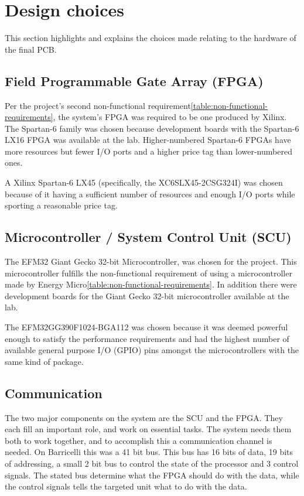 \section{Design choices} 
This section highlights and explains the choices made relating to the hardware of the final PCB.

\subsection{Field Programmable Gate Array (FPGA)} \label{pcb:design-choices:ss:fpga}
Per the project's second non-functional requirement\vref{table:non-functional-requirements}, the system's FPGA was required to be one produced by Xilinx.
The Spartan-6 family was chosen because development boards with the Spartan-6 LX16 FPGA was available at the lab.
Higher-numbered Spartan-6 FPGAs have more resources but fewer I/O ports and a higher price tag than lower-numbered ones.

A Xilinx Spartan-6 LX45 (specifically, the XC6SLX45-2CSG324I) was chosen because of it having a sufficient number of resources and enough I/O ports while sporting a reasonable price tag.


\subsection{Microcontroller / System Control Unit (SCU)} \label{pcb:design-choices:ss:scu}
The EFM32 Giant Gecko 32-bit Microcontroller, was chosen for the project.
This microcontroller fulfills the non-functional requirement of using a microcontroller made by Energy Micro\vref{table:non-functional-requirements}.
In addition there were development boards for the Giant Gecko 32-bit microcontroller available at the lab.

The EFM32GG390F1024-BGA112 was chosen because it was deemed powerful enough to satisfy the performance requirements and had the highest number of available general purpose I/O (GPIO) pins amongst the microcontrollers with the same kind of package.


\subsection{Communication} \label{pcb:design-choices:ss:internal_communication}
The two major components on the system are the SCU and the FPGA.
They each fill an important role, and work on essential tasks.
The system needs them both to work together, and to accomplish this a communication channel is needed.
On Barricelli this was a 41 bit bus.
This bus has 16 bits of data, 19 bits of addressing, a small 2 bit bus to control the state of the processor and 3 control signals.
The stated bus determine what the FPGA should do with the data, while the control signals tells the targeted unit what to do with the data. 


